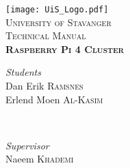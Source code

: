 \begin{titlepage} %
	\newcommand{\HRule}{\rule{\linewidth}{0.5mm}} %
	
	\center %
	
	
	\vfill
	\texttt{[image: UiS\_Logo.pdf]}\\[1cm] %
	\textsc{\LARGE University of Stavanger}\\[1.5cm] %
	
	
	\textsc{\Large Technical Manual}\\[1.5cm] %
	
	
	{\Huge\bfseries \textsc{Raspberry Pi 4 Cluster}}\\[3.0cm]
	
	
	\begin{minipage}{0.4\textwidth}
		\begin{flushleft}
			\large
			\textit{Students}\\
			Dan Erik \textsc{Ramsnes}\\
			Erlend Moen \textsc{Al-Kasim}
		\end{flushleft}
	\end{minipage}
	~
	\begin{minipage}{0.4\textwidth}
		\begin{flushright}
			\large
			\textit{Supervisor}\\
			Naeem \textsc{Khademi}\\
			\phantom{1pt}
		\end{flushright}
	\end{minipage}
	
	
	\vfill\vfill\vfill %
	\vfill %
	
\end{titlepage}